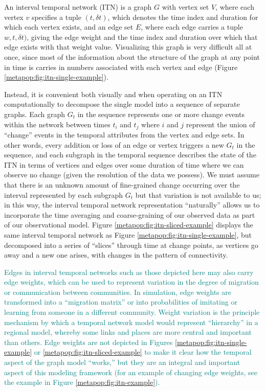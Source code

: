     An interval temporal network (ITN) is a graph \(G\) with vertex set \(V\), where each vertex \(v\) specifies a tuple \((t, \delta t)\), which denotes the time index and duration for which each vertex exists, and an edge set \(E\), where each edge carries a tuple \(w, t, \delta t)\), giving the edge weight and the time index and duration over which that edge exists with that weight value.  Visualizing this graph is very difficult all at once, since most of the information about the structure of the graph at any point in time is carries in numbers associated with each vertex and edge (Figure \ref{metapop:fig:itn-single-example}).  
    
    Instead, it is convenient both visually and when operating on an ITN computationally to decompose the single model into a sequence of separate graphs.  Each graph \(G_t\) in the sequence represents one
    or more change events within the network between times \(t_i\) and
    \(t_j\) where \(i\) and \(j\) represent the union of ``change'' events in the temporal attributes from the vertex and edge sets.  In other words, every addition or loss of an edge or vertex triggers a new \(G_t\) in the sequence, and each subgraph in the temporal sequence describes the state of the ITN in terms of vertices and edges over some duration of time where we can observe no change (given the resolution of the data we possess).  We must assume that there is an unknown amount of fine-grained change occurring over the interval represented by each subgraph \(G_t\) but that variation is not available to us; in this way, the interval temporal network representation ``naturally'' allows us to incorporate the time averaging and coarse-graining of our observed data as part of our observational model.  Figure \ref{metapop:fig:itn-sliced-example} displays the same interval temporal network as Figure \ref{metapop:fig:itn-single-example}, but decomposed into a series of ``slices'' through time at change points, as vertices go away and a new one arises, with changes in the pattern of connectivity.

    \textcolor{teal}{
    Edges in interval temporal networks such as those depicted here may also carry edge weights, which can be used to represent variation in the degree of migration or communication between communities.  In simulation, edge weights are transformed into a ``migration matrix'' or into probabilities of imitating or learning from someone in a different community.  Weight variation is the principle mechanism by which a temporal network model would represent ``hierarchy'' in a regional model, whereby some links and places are more central and important than others.  Edge weights are not depicted in Figures \ref{metapop:fig:itn-single-example} or \ref{metapop:fig:itn-sliced-example} to make it clear how the temporal aspect of the graph model ``works,'' but they are an integral and important aspect of this modeling framework (for an example of changing edge weights, see the example in Figure \ref{metapop:fig:itn-example}).  
    }

